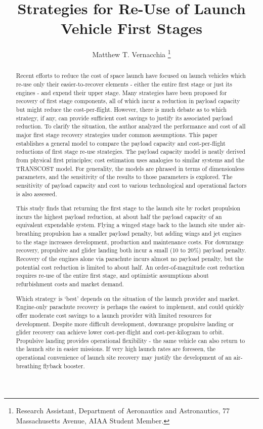 \documentclass[conf]{new-aiaa}
\title{Strategies for Re-Use of Launch Vehicle First Stages}
\author{Matthew T. Vernacchia \footnote{Research Assistant, Department of Aeronautics and Astronautics, 77 Massachusetts Avenue, AIAA Student Member.}}
\affil{Massachusetts Institute of Technology, Cambridge, MA, 02139}
\begin{document}
\maketitle

\begin{abstract}
Recent efforts to reduce the cost of space launch have focused on launch vehicles which re-use only their easier-to-recover elements - either the entire first stage or just its engines - and expend their upper stage.
Many strategies have been proposed for recovery of first stage components, all of which incur a reduction in payload capacity but might reduce the cost-per-flight.
However, there is much debate as to which strategy, if any, can provide sufficient cost savings to justify its associated payload reduction.
To clarify the situation, the author analyzed the performance and cost of all major first stage recovery strategies under common assumptions.
This paper establishes a general model to compare the payload capacity and cost-per-flight reductions of first stage re-use strategies. The payload capacity model is neatly derived from physical first principles; cost estimation uses analogies to similar systems and the TRANSCOST model. For generality, the models are phrased in terms of dimensionless parameters, and the sensitivity of the results to those parameters is explored.
The sensitivity of payload capacity and cost to various technological and operational factors is also assessed.

This study finds that returning the first stage to the launch site by rocket propulsion incurs the highest payload reduction, at about half the payload capacity of an equivalent expendable system.  Flying a winged stage back to the launch site under air-breathing propulsion has a smaller payload penalty, but adding wings and jet engines to the stage increases development, production and maintenance costs. For downrange recovery, propulsive and glider landing both incur a small (10 to 20\%) payload penalty. Recovery of the engines alone via parachute incurs almost no payload penalty, but the potential cost reduction is limited to about half. An order-of-magnitude cost reduction requires re-use of the entire first stage, and optimistic assumptions about refurbishment costs and market demand.

Which strategy is `best' depends on the situation of the launch provider and market. Engine-only parachute recovery is perhaps the easiest to implement, and could quickly offer moderate cost savings to a launch provider with limited resources for development. Despite more difficult development, downrange propulsive landing or glider recovery can achieve lower cost-per-flight and cost-per-kilogram to orbit. Propulsive landing provides operational flexibility - the same vehicle can also return to the launch site in easier missions. If very high launch rates are foreseen, the operational convenience of launch site recovery may justify the development of an air-breathing flyback booster.




\end{abstract}
\end{document}
